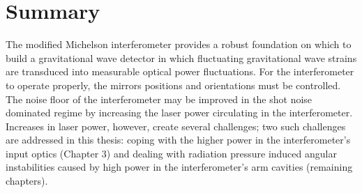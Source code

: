 
\section{Summary}
The modified Michelson interferometer provides a robust foundation on
which to build a gravitational wave detector in which fluctuating
gravitational wave strains are transduced into measurable optical
power fluctuations.  For the interferometer to operate properly, the
mirrors positions and orientations must be controlled.  The noise
floor of the interferometer may be improved in the shot noise
dominated regime by increasing the laser power circulating in the
interferometer.  Increases in laser power, however, create several
challenges; two such challenges are addressed in this thesis: coping
with the higher power in the interferometer's input optics (Chapter 3)
and dealing with radiation pressure induced angular instabilities
caused by high power in the interferometer's arm cavities (remaining
chapters).
